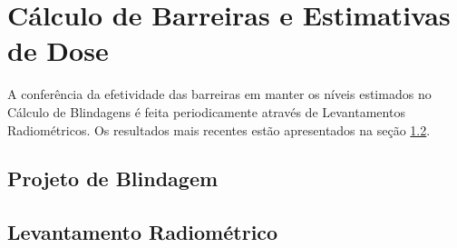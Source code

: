 \chapter{Cálculo de Barreiras e Estimativas de Dose}
\label{ch:calculo_barreiras-estimativa_dose}
A conferência da efetividade das barreiras em manter os níveis estimados no Cálculo de Blindagens é feita periodicamente através de Levantamentos Radiométricos. Os resultados mais recentes estão apresentados na seção \ref{sec:levantamento_radiometrico}.

\pagebreak
\section{Projeto de Blindagem}
\label{sec:projeto_blindagem}

\section{Levantamento Radiométrico}
\label{sec:levantamento_radiometrico}
